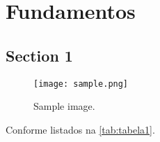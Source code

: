 \chapter{Fundamentos}
\label{cha:fundamentos}

\lipsum

\section{Section 1}
\label{sec:industria4}

\lipsum

\begin{figure}[htb]
	\centering
	\texttt{[image: sample.png]}
	\caption{Sample image.}
	\label{fig:sample2}
\end{figure}

Conforme listados na \autoref{tab:tabela1}.

